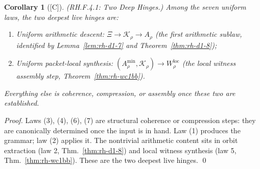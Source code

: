 \documentclass[12pt,oneside]{amsbook}
\theoremstyle{plain}
\newtheorem{corollary}[theorem]{Corollary}
\theoremstyle{definition}
\theoremstyle{remark}
\newcommand{\status}[1]{\textup{[#1]}}
\begin{document}
\begin{corollary}[\status{C}]\label{cor:rh-f4-1}
\textup{(RH.F.4.1: Two Deep Hinges.)}
Among the seven uniform laws, the two deepest live hinges are:
\begin{enumerate}[label=\textup{(\arabic*)}]
 \item \emph{Uniform arithmetic descent}: $\Xi \to \mathcal{K}_\rho
 \to A_\rho$ (the first arithmetic sublaw, identified by
 Lemma~\ref{lem:rh-d1-7} and Theorem~\ref{thm:rh-d1-8});
 \item \emph{Uniform packet-local synthesis}: $(A_\rho^{\min},
 \mathcal{K}_\rho) \to W_\rho^{\mathrm{loc}}$ (the local witness
 assembly step, Theorem~\ref{thm:rh-wc1bb}).
\end{enumerate}
Everything else is coherence, compression, or assembly once these
two are established.
\end{corollary}

\begin{proof}
Laws (3), (4), (6), (7) are structural coherence or compression
steps: they are canonically determined once the input is in hand.
Law (1) produces the grammar; law (2) applies it. The nontrivial
arithmetic content sits in orbit extraction (law 2, Thm.~\ref{thm:rh-d1-8})
and local witness synthesis (law 5, Thm.~\ref{thm:rh-wc1bb}).
These are the two deepest live hinges. \qed
\end{proof}
\end{document}
